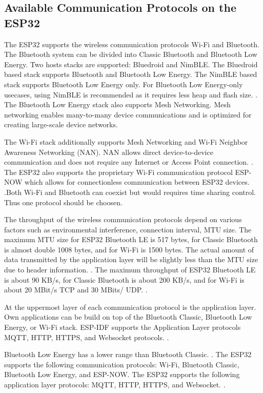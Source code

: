 \subsection{Available Communication Protocols on the ESP32}
The ESP32 supports the wireless communication protocols Wi-Fi and Bluetooth. The Bluetooth system can be divided into Classic Bluetooth and Bluetooth Low Energy. Two hosts stacks are supported: Bluedroid and NimBLE. The Bluedroid based stack supports Bluetooth and Bluetooth Low Energy. The NimBLE based stack supports Bluetooth Low Energy only. For Bluetooth Low Energy-only usecases, using NimBLE is recommended as it requires less heap and flash size. \cite{esp-prog} \cite{esp-faq}. The Bluetooth Low Energy stack also supports Mesh Networking. Mesh networking enables many-to-many device communications and is optimized for creating large-scale device networks.\cite{esp-prog}

The Wi-Fi stack additionally supports Mesh Networking and Wi-Fi Neighbor Awareness Networking (NAN). NAN allows direct device-to-device communication and does not require any Internet or Access Point connection. \cite{esp-prog}. The ESP32 also supports the proprietary Wi-Fi communication protocol ESP-NOW which allows for connectionless communication between ESP32 devices. \cite{esp-prog}.Both Wi-Fi and Bluetooth can coexist but would requires time sharing control. Thus one protocol should be choosen.

The throughput of the wireless communication protocols depend on various factors such as environmental interference, connection interval, MTU size. The maximum MTU size for ESP32 Bluetooth LE is 517 bytes, for Classic Bluetooth is almost double 1008 bytes, and for Wi-Fi is 1500 bytes. The actual amount of data transmitted by the application layer will be slightly less than the MTU size due to header information. \cite{esp-faq}. The maximum throughput of ESP32 Bluetooth LE is about 90 KB/s, for Classic Bluetooth is about 200 KB/s, and for Wi-Fi is about 20 MBit/s TCP and 30 MBits/ UDP. \cite{esp-prog} \cite{esp-faq}.



At the uppermost layer of each communication protocol is the application layer. Own applications can be build on top of the Bluetooth Classic, Bluetooth Low Energy, or Wi-Fi stack. ESP-IDF supports the Application Layer protocols MQTT, HTTP, HTTPS, and Websocket protocols. \cite{esp-prog}.



Bluetooth Low Energy has a lower range than Bluetooth Classic. \cite{esp-faq}. The ESP32 supports the following communication protocols: Wi-Fi, Bluetooth Classic, Bluetooth Low Energy, and ESP-NOW. The ESP32 supports the following application layer protocols: MQTT, HTTP, HTTPS, and Websocket. \cite{esp-prog}.


